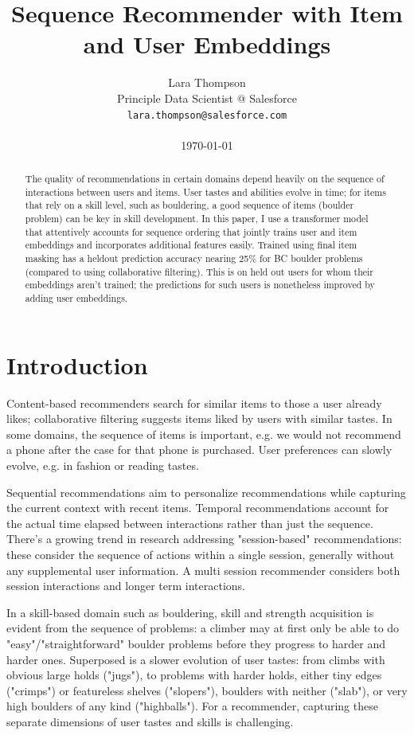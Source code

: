 \documentclass[10pt]{article}
\title{Sequence Recommender with Item and User Embeddings}
\author{Lara Thompson \\
  Principle Data Scientist @ Salesforce \\
  \texttt{lara.thompson@salesforce.com} \\ \\
  \today
}
\begin{document}
\maketitle
\begin{abstract}
The quality of recommendations in certain domains depend heavily on the sequence of interactions between users and items. User tastes and abilities evolve in time; for items that rely on a skill level, such as bouldering, a good sequence of items (boulder problem) can be key in skill development. In this paper, I use a transformer model that attentively accounts for sequence ordering that jointly trains user and item embeddings and incorporates additional features easily. Trained using final item masking has a heldout prediction accuracy nearing 25\% for BC boulder problems (compared to  using collaborative filtering). This is on held out users for whom their embeddings aren't trained; the predictions for such users is nonetheless improved by adding user embeddings. 
\end{abstract}

\section{Introduction}

Content-based recommenders search for similar items to those a user already likes; collaborative filtering suggests items liked by users with similar tastes. In some domains, the sequence of items is important, e.g. we would not recommend a phone after the case for that phone is purchased. User preferences can slowly evolve, e.g. in fashion or reading tastes.

Sequential recommendations aim to personalize recommendations while capturing the current context with recent items. Temporal recommendations account for the actual time elapsed between interactions rather than just the sequence. There's a growing trend in research addressing "session-based" recommendations: these consider the sequence of actions within a single session, generally without any supplemental user information. A multi session recommender considers both session interactions and longer term interactions. 

In a skill-based domain such as bouldering, skill and strength acquisition is evident from the sequence of problems: a climber may at first only be able to do "easy"/"straightforward" boulder problems before they progress to harder and harder ones. Superposed is a slower evolution of user tastes: from climbs with obvious large holds ("jugs"), to problems with harder holds, either tiny edges ("crimps") or featureless shelves ("slopers"), boulders with neither ("slab"), or very high boulders of any kind ("highballs"). For a recommender, capturing these separate dimensions of user tastes and skills is challenging. 
\end{document}
